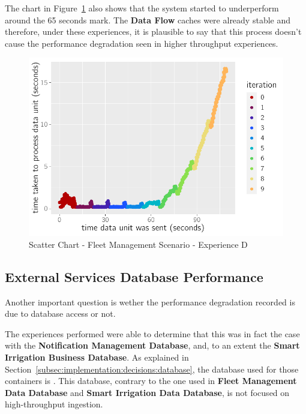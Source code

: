  The chart in Figure~\ref{fig:evaluation:overview:cache:chart:s1eD} also shows that the system started to underperform around the 65 seconds mark. The \textbf{Data Flow} caches were already stable and therefore, under these experiences, it is plausible to say that this process doesn't cause the performance degradation seen in higher throughput experiences.

\begin{figure}[H]
    \centering
    \includegraphics[page=1]{assets/charts/s1eD.pdf}
    \caption[Scatter Chart - Fleet Management Scenario - Experience D]{Scatter Chart - Fleet Management Scenario - Experience D}
    \label{fig:evaluation:overview:cache:chart:s1eD}
\end{figure}

\subsection{External Services Database Performance}
\label{subsec:evaluation:overview:servicedatabase}

Another important question is wether the performance degradation recorded is due to database access or not.

The experiences performed were able to determine that this was in fact the case with the \textbf{Notification Management Database}, and, to an extent the \textbf{Smart Irrigation Business Database}. As explained in Section~\ref{subsec:implementation:decisions:database}, the database used for those containers is .
This database, contrary to the one used in \textbf{Fleet Management Data Database} and \textbf{Smart Irrigation Data Database}, is not focused on high-throughput ingestion.

